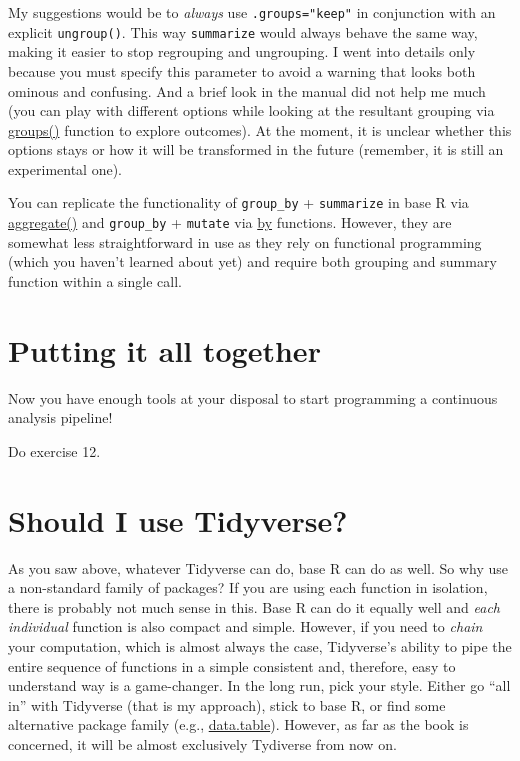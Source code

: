 \documentclass[
]{book}
\begin{document}
My suggestions would be to \emph{always} use \texttt{.groups="keep"} in conjunction with an explicit \texttt{ungroup()}. This way \texttt{summarize} would always behave the same way, making it easier to stop regrouping and ungrouping. I went into details only because you must specify this parameter to avoid a warning that looks both ominous and confusing. And a brief look in the manual did not help me much (you can play with different options while looking at the resultant grouping via \href{https://dplyr.tidyverse.org/reference/group_data.html}{groups()} function to explore outcomes). At the moment, it is unclear whether this options stays or how it will be transformed in the future (remember, it is still an experimental one).

You can replicate the functionality of \texttt{group\_by} + \texttt{summarize} in base R via \href{https://stat.ethz.ch/R-manual/R-patched/library/stats/html/aggregate.html}{aggregate()} and \texttt{group\_by} + \texttt{mutate} via \href{https://stat.ethz.ch/R-manual/R-patched/library/base/html/by.html}{by} functions. However, they are somewhat less straightforward in use as they rely on functional programming (which you haven't learned about yet) and require both grouping and summary function within a single call.

\hypertarget{putting-it-all-together}{%
\section{Putting it all together}\label{putting-it-all-together}}

Now you have enough tools at your disposal to start programming a continuous analysis pipeline!

Do exercise 12.

\hypertarget{should-i-use-tidyverse}{%
\section{Should I use Tidyverse?}\label{should-i-use-tidyverse}}

As you saw above, whatever Tidyverse can do, base R can do as well. So why use a non-standard family of packages? If you are using each function in isolation, there is probably not much sense in this. Base R can do it equally well and \emph{each individual} function is also compact and simple. However, if you need to \emph{chain} your computation, which is almost always the case, Tidyverse's ability to pipe the entire sequence of functions in a simple consistent and, therefore, easy to understand way is a game-changer. In the long run, pick your style. Either go ``all in'' with Tidyverse (that is my approach), stick to base R, or find some alternative package family (e.g., \href{https://github.com/Rdatatable/data.table}{data.table}). However, as far as the book is concerned, it will be almost exclusively Tydiverse from now on.
\end{document}
